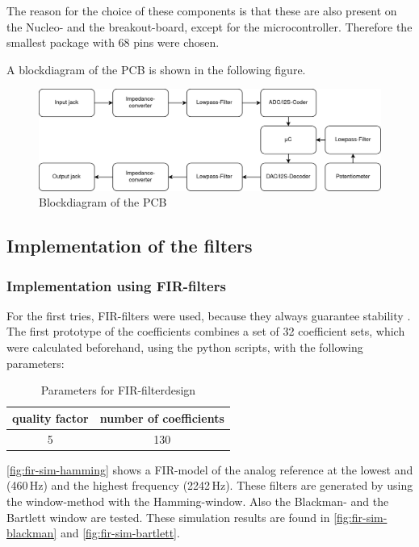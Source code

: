 The reason for the choice of these components is that these are also present on the Nucleo- and the
breakout-board, except for the microcontroller. Therefore the smallest package with 68 pins were chosen.

A blockdiagram of the \ac{PCB} is shown in the following figure.

\begin{figure}[!h]
    \centering
    \includegraphics[width=\textwidth]{img/blockdiagram.png}
    \caption{Blockdiagram of the PCB}
    \label{fig:blockdiagram}
\end{figure}

\subsection{Implementation of the filters}

\subsubsection{Implementation using \ac{FIR}-filters}

For the first tries, \ac{FIR}-filters were used, because they always guarantee stability \cite{meyer_signalverarbeitung}.
The first prototype of the coefficients combines a set of 32 coefficient sets, which were calculated beforehand,
using the python scripts, with the following parameters:

\begin{table}[!h]
    \centering
    \caption{Parameters for \ac{FIR}-filterdesign}
    \label{table:fir-filterdesign}
    \begin{tabular}{c | c }
        quality factor & number of coefficients\\
        \hline
        5 & 130
    \end{tabular}
\end{table}

\autoref{fig:fir-sim-hamming} shows a \ac{FIR}-model of the analog reference at the lowest and (460\,Hz) and the highest
frequency (2242\,Hz). These filters are generated by using the window-method with the Hamming-window.
Also the Blackman- and the Bartlett window are tested. These simulation results are found in
\autoref{fig:fir-sim-blackman} and \autoref{fig:fir-sim-bartlett}.

